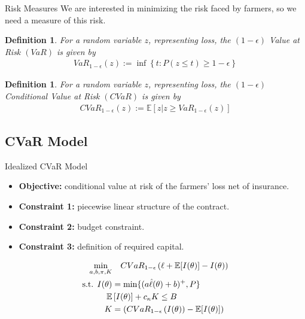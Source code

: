 \documentclass{beamer}
\newtheorem{defn}[theorem]{Definition}
\begin{document}
\begin{frame}{Risk Measures}
We are interested in minimizing the risk faced by farmers, so we need a measure of this risk. 

\begin{defn}
    For a random variable $z$, representing loss, the $(1-\epsilon)$ Value at Risk $(VaR)$ is given by 
    \begin{align*}
      VaR_{1-\epsilon}(z) := \inf \left \{ t : P(z \leq t) \geq 1-\epsilon \right \}
    \end{align*}
  \end{defn}

  \begin{defn}
    For a random variable $z$, representing loss, the $(1-\epsilon)$ Conditional Value at Risk $(CVaR)$ is given by 
    \begin{align*}
      CVaR_{1-\epsilon}(z) := \mathbb{E}\left [z | z \geq VaR_{1-\epsilon}(z) \right ]
    \end{align*}
  \end{defn}
\end{frame}

\subsection{CVaR Model}
\begin{frame}{Idealized CVaR Model}
\label{ideal-model}
\begin{itemize}
    \item \textbf{Objective:} conditional value at risk of the farmers' loss net of insurance.
    \item  \textbf{Constraint 1:} piecewise linear structure of the contract. 
    \item \textbf{Constraint 2:} budget constraint.
    \item \textbf{Constraint 3:} definition of required capital.
\end{itemize}
 
\begin{align}
        \min_{a,b,\pi, K}  & \quad CVaR_{1-\epsilon}\left ( \ell + \mathbb{E}[I(\theta)] - I(\theta) \right) \notag\\
        \text{s.t.   }I(\theta) &= \min \{ (a\hat{\ell}(\theta) + b)^+,P \} \\
        \mathbb{E}&\left [ I(\theta) \right ] + c_{\kappa} K \leq B \\
        K &= \left( CVaR_{1-\epsilon}\left ( I(\theta) \right ) - \mathbb{E}[I(\theta)] \right) \label{cons-budget}
    \end{align}
\end{frame}
\end{document}
